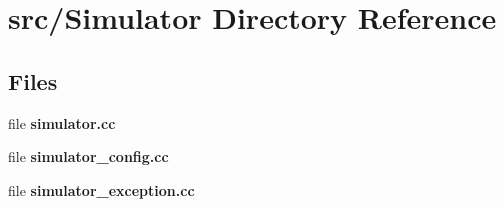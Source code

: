 \section{src/\+Simulator Directory Reference}
\label{dir_9994e8d78827318b32c660b708636a19}
\subsection*{Files}
\begin{DoxyCompactItemize}
\item 
file {\bfseries simulator.\+cc}
\item 
file {\bfseries simulator\+\_\+config.\+cc}
\item 
file {\bfseries simulator\+\_\+exception.\+cc}
\end{DoxyCompactItemize}
